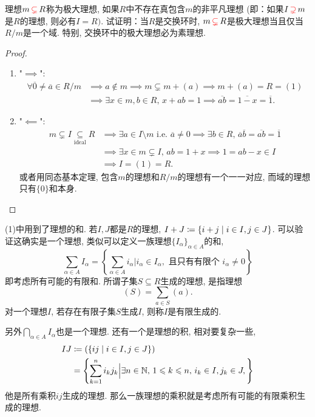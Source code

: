 \begin{problem}\label{ex:2.1.6}
    理想$m \,\textcolor{red}{\subsetneq}\, R$称为极大理想, 如果$R$中不存在真包含$m$的非平凡理想
(即：如果$I \,\textcolor{red}{\supsetneq}\, m$是$R$的理想, 则必有$I = R)$. 试证明：当$R$是交换环时, 
$m \,\textcolor{red}{\subsetneq}\, R$是极大理想当且仅当$R/m$是一个域. 特别, 交换环中的极大理想必为素理想.
\end{problem}

\begin{proof}
    \begin{enumerate}[(1)]
        \item "$\implies$":
        \[
        \begin{aligned}
            \forall \overline{0} \neq \overline{a} \in R/m &\implies a \notin m \implies m \subsetneq m + (a) \implies m + (a) = R = (1)\\
            &\implies \exists x \in m, b \in R,\, x + ab = 1 \implies \overline{ab} = \overline{1 - x} = \overline{1}.
        \end{aligned}
        \]
        \item "$\impliedby$":
        \[
        \begin{aligned}
            m \subsetneq I \underset{\text{ideal}}{\subseteq} R &\implies \exists a \in I \setminus m \text{ i.e. } \overline{a} \neq 0 \implies \exists b \in R,\, \overline{a}\overline{b} = \overline{ab} = \overline{1}\\
            &\implies \exists x \in m \subsetneq I,\, ab = 1 + x \implies 1 = ab - x \in I \\
            &\implies I = (1) = R.
        \end{aligned}
        \]
        或者用同态基本定理, 包含$m$的理想和$R/m$的理想有一个一一对应, 而域的理想只有$\{0\}$和本身.
    \end{enumerate}
\end{proof}

\begin{remark}
    (1)中用到了理想的和. 若$I, J$都是$R$的理想, $I + J \mathrel{\coloneqq} \{i + j \mid i \in I, j \in J\}$. 可以验证这确实是一个理想, 类似可以定义一族理想$\{I_\alpha\}_{\alpha \in A}$的和,
\[
    \sum_{\alpha \in A} I_\alpha = \left\{\sum_{\alpha \in A} i_\alpha \Big| i_\alpha \in I_\alpha, \text{ 且只有有限个 } i_\alpha \neq 0 \right\} 
\]
即考虑所有可能的有限和. 所谓子集$S \subseteq R$生成的理想, 是指理想
\[
    (S) = \sum_{a \in S} (a).
\]
对一个理想$I$, 若存在有限子集$S$生成$I$, 则称$I$是有限生成的.

    另外$\bigcap_{\alpha \in A} I_\alpha$也是一个理想. 还有一个是理想的积, 相对要复杂一些,
\[
\begin{aligned}
    IJ &\mathrel{\coloneqq} (\{ij \mid i \in I, j \in J\})\\
    &= \left\{\sum_{k = 1}^{n} i_kj_k \Big| \exists n \in \mathbb{N},\, 1 \leqslant k \leqslant n,\, i_k \in I, j_k \in J, \right\}
\end{aligned}  
\]
他是所有乘积$ij$生成的理想. 那么一族理想的乘积就是考虑所有可能的有限乘积生成的理想.
\end{remark}

